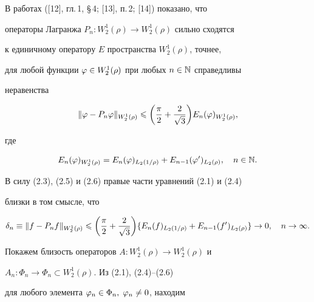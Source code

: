 В работах ([12], гл.\,1, \S\,4; [13], п.\,2; [14]) показано, что 


операторы Лагранжа $P_n:W_2^1(\rho)\to W_2^1(\rho)$ сильно сходятся 


к единичному оператору $E$ пространства $W_2^1(\rho)$, точнее, 


для любой функции $\varphi\in W_2^1(\rho)$ при любых $n\in \Bbb N$ справедливы 


неравенства 


\begin{equation}


\|\vp-P_n\vp\|_{W_2^1(\rho)}\lea \bigg(\frac{\pi}{2}+


\frac{2}{\sqrt{3}}\bigg) E_n(\vp)_{W_2^1(\rho)},


\end{equation}


где 


\begin{equation}


E_n(\vp)_{W_2^1(\rho)} = E_n(\vp)_{L_2(1/\rho)}+E_{n-1}(\vp')_{L_2(\rho)},


\quad n\in\N.


\end{equation}





В силу (2.3), (2.5) и (2.6) правые части уравнений (2.1) и (2.4) 


близки в том смысле, что


\begin{equation}


\delta_n \equiv \|f - P_nf\|_{W_2^1(\rho)}\lea


\bigg(\frac{\pi}{2}+\frac{2}{\sqrt{3}}


\bigg)\{E_n(f)_{L_2(1/\rho)}+E_{n-1}(f')_{L_2(\rho)}\}\to 0,


\quad n\to \infty.


\end{equation}





Покажем близость операторов $A:W_2^1(\rho)\to W_2^1(\rho)$ и


$A_n:\Phi_n\to \Phi_n \subset W_2^1(\rho).$ Из (2.1), (2.4)--(2.6)


для любого элемента $\varphi_n\in \Phi_n,$ $\varphi_n\ne 0$, находим


